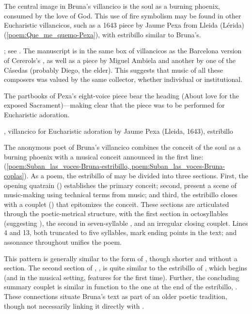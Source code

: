 The central image in Bruna's villancico is the soul as a burning phoenix,
consumed by the love of God.
This use of fire symbolism may be found in other Eucharistic villancicos, such
as a 1643 piece by Jaume Pexa from Lleida (Lérida)
(\cref{poem:Que_me_quemo-Pexa}), with estribillo similar to Bruna's.%
\begin{Footnote}
    ; see .
    The manuscript is in the same box of villancicos as the Barcelona version
    of Cererols's , as well as a piece by Miguel
    Ambiela and another by one of the Cásedas (probably Diego, the elder).  
    This suggests that music of all these composers was valued by the same
    collector, whether individual or institutional.
\end{Footnote}
The partbooks of Pexa's eight-voice piece bear the heading  (About love for the exposed Sacrament)---making clear that
the piece was to be performed for Eucharistic adoration.  

{, villancico for Eucharistic adoration by Jaume Pexa
(Lleida, 1643), estribillo}


The anonymous poet of Bruna's villancico combines the conceit of the soul as a
burning phoenix with a musical conceit announced in the first line:  (\cref{poem:Suban_las_voces-Bruna-estribillo,
poem:Suban_las_voces-Bruna-coplas}).
As a poem, the estribillo of  may be divided into three
sections. 
First, the opening quatrain () establishes the primary conceit;
second,  present a scene of music-making using technical terms
from music; and third, the estribillo closes with a couplet
() that epitomizes the conceit.
These sections are articulated through the poetic-metrical structure, with the
first section in octosyllables (suggesting ), the second in
seven-syllable , and an irregular closing couplet.
Lines 4 and 13, both truncated to five syllables, mark ending points in the
text; and assonance throughout unifies the poem.

This pattern is generally similar to the form of , though shorter and without a  section.  
The second section of , , is quite similar to the estribillo of , which begins
 (and in the musical
setting, features  for the first time).
Further, the concluding summary couplet is similar in function to the one at
the end of the  estribillo, .
These connections situate Bruna's text as part of an older poetic tradition,
though not necessarily linking it directly with .

